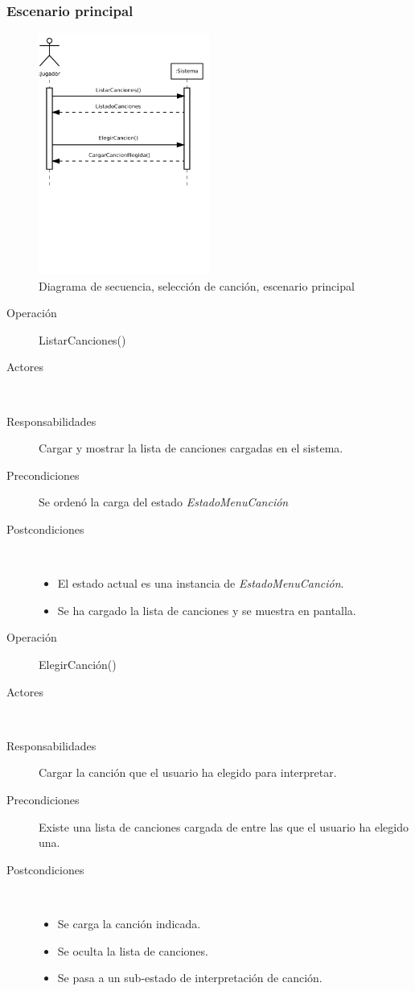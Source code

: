 \subsubsection{Escenario principal}
\begin{figure}[h!]
  \centering
  \includegraphics[trim=0cm 12cm 0cm 0cm, clip=true, width=0.5\textwidth]{4_analisis/diagsec_caso2_esc1}
  \caption{Diagrama de secuencia, selección de canción, escenario principal}
\end{figure}

\begin{description}
\item[Operación] ListarCanciones()
\item[Actores] \jugador\, \sistema\
\item[Responsabilidades] Cargar y mostrar la lista de canciones cargadas en el
  sistema.
\item[Precondiciones] Se ordenó la carga del estado \textit{EstadoMenuCanción}
\item[Postcondiciones] $\quad$
  \begin{itemize}
  \item El estado actual es una instancia de \textit{EstadoMenuCanción}.
  \item Se ha cargado la lista de canciones y se muestra en pantalla.
  \end{itemize}
\end{description}

\begin{description}
\item[Operación] ElegirCanción()
\item[Actores] \jugador\, \sistema\
\item[Responsabilidades] Cargar la canción que el usuario ha elegido para
  interpretar.
\item[Precondiciones] Existe una lista de canciones cargada de entre las que el
  usuario ha elegido una.
\item[Postcondiciones] $\quad$
  \begin{itemize}
  \item Se carga la canción indicada.
  \item Se oculta la lista de canciones.
  \item Se pasa a un sub-estado de interpretación de canción.
  \end{itemize}
\end{description}

